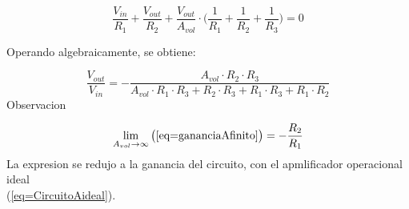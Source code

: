 \documentclass[../../main.tex]{subfiles}
\begin{document}
$$\frac{V_{in}}{R_{1}} + \frac{V_{out}}{R_{2}}+\frac{V_{out}}{A_{vol}}\cdot \bigg( \frac{1}{R_{1}} + \frac{1}{R_{2}} + \frac{1}{R_{3}} \bigg) = 0$$

Operando algebraicamente, se obtiene:

\begin{equation}
\frac{V_{out}}{V_{in}}= - \frac{A_{vol} \cdot R_{2} \cdot R_{3}}{A_{vol}\cdot R_{1} \cdot R_{3} + R_{2} \cdot R_{3} +  R_{1} \cdot R_{3} + R_{1} \cdot R_{2} }\label{eq=gananciaAfinito}
\end{equation}
Observacion

$$ \lim_{A_{vol}\to\infty} \big( \ref{eq=gananciaAfinito} \big) = -\frac{R_{2}}{R_{1}} $$
La expresion se redujo a la ganancia del circuito, con el apmlificador operacional ideal\\ \big(\ref{eq=CircuitoAideal}\big).



 
\end{document}
